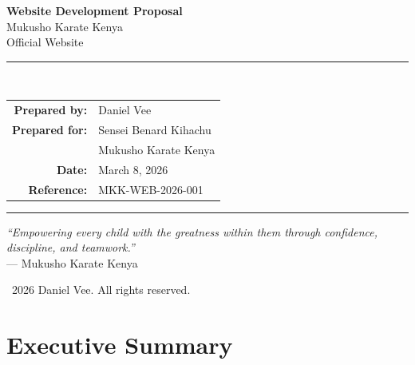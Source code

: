 \documentclass[12pt,a4paper]{article}
\begin{document}
\begin{titlepage}
    \centering
    \vspace*{2cm}

    {\Huge\bfseries\color{mkgreen} Website Development Proposal}\\[0.5cm]
    {\LARGE\color{mkdark} Mukusho Karate Kenya}\\[0.3cm]
    {\large\color{mkamber} Official Website}\\[2cm]

    \rule{\textwidth}{1pt}\\[0.5cm]

    \begin{tabular}{rl}
        \textbf{Prepared by:}  & Daniel Vee \\[0.3em]
        \textbf{Prepared for:} & Sensei Benard Kihachu \\
                               & Mukusho Karate Kenya \\[0.3em]
        \textbf{Date:}         & March 8, 2026 \\[0.3em]
        \textbf{Reference:}    & MKK-WEB-2026-001 \\
    \end{tabular}

    \vspace{1cm}
    \rule{\textwidth}{1pt}

    \vfill

    {\small\color{mkgray}
    \textit{``Empowering every child with the greatness within them through confidence, discipline, and teamwork.''}\\
    --- Mukusho Karate Kenya}

    \vspace{1cm}
    {\small\textcolor{mkgray}{\textcopyright\ 2026 Daniel Vee. All rights reserved.}}
\end{titlepage}

\tableofcontents
\newpage

\section{Executive Summary}
\end{document}
